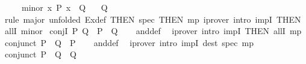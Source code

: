 \begin{isabellebody}
\ \ \ \ \ minor{\isacharcolon}{\kern0pt}\ {\isachardoublequoteopen}{\isasymAnd}x{\isachardot}{\kern0pt}\ P\ x\ {\isasymLongrightarrow}\ Q{\isachardoublequoteclose}\isanewline
\ \ \ {\isachardoublequoteopen}Q{\isachardoublequoteclose}\isanewline
%
\isadelimproof
\ \ %
\endisadelimproof
%
\isatagproof
{}\isamarkupfalse%
\ {\isacharparenleft}{\kern0pt}rule\ major\ {\isacharbrackleft}{\kern0pt}unfolded\ Ex{\isacharunderscore}{\kern0pt}def{\isacharcomma}{\kern0pt}\ THEN\ spec{\isacharcomma}{\kern0pt}\ THEN\ mp{\isacharbrackright}{\kern0pt}{\isacharparenright}{\kern0pt}\ {\isacharparenleft}{\kern0pt}iprover\ intro{\isacharcolon}{\kern0pt}\ impI\ {\isacharbrackleft}{\kern0pt}THEN\ allI{\isacharbrackright}{\kern0pt}\ minor{\isacharparenright}{\kern0pt}%
\endisatagproof
{\isafoldproof}%
%
\isadelimproof
%
\endisadelimproof
%
\isadelimdocument
%
\endisadelimdocument
%
\isatagdocument
%
\isamarkuptrue%
%
\endisatagdocument
{\isafolddocument}%
%
\isadelimdocument
%
\endisadelimdocument
{}\isamarkupfalse%
\ conjI{\isacharcolon}{\kern0pt}\ {\isachardoublequoteopen}{\isasymlbrakk}P{\isacharsemicolon}{\kern0pt}\ Q{\isasymrbrakk}\ {\isasymLongrightarrow}\ P\ {\isasymand}\ Q{\isachardoublequoteclose}\isanewline
%
\isadelimproof
\ \ %
\endisadelimproof
%
\isatagproof
{}\isamarkupfalse%
\ and{\isacharunderscore}{\kern0pt}def\ \isamarkupfalse%
\ {\isacharparenleft}{\kern0pt}iprover\ intro{\isacharcolon}{\kern0pt}\ impI\ {\isacharbrackleft}{\kern0pt}THEN\ allI{\isacharbrackright}{\kern0pt}\ mp{\isacharparenright}{\kern0pt}%
\endisatagproof
{\isafoldproof}%
%
\isadelimproof
\isanewline
%
\endisadelimproof
\isanewline
{}\isamarkupfalse%
\ conjunct{}{\isacharcolon}{\kern0pt}\ {\isachardoublequoteopen}{\isasymlbrakk}P\ {\isasymand}\ Q{\isasymrbrakk}\ {\isasymLongrightarrow}\ P{\isachardoublequoteclose}\isanewline
%
\isadelimproof
\ \ %
\endisadelimproof
%
\isatagproof
{}\isamarkupfalse%
\ and{\isacharunderscore}{\kern0pt}def\ \isamarkupfalse%
\ {\isacharparenleft}{\kern0pt}iprover\ intro{\isacharcolon}{\kern0pt}\ impI\ dest{\isacharcolon}{\kern0pt}\ spec\ mp{\isacharparenright}{\kern0pt}%
\endisatagproof
{\isafoldproof}%
%
\isadelimproof
\isanewline
%
\endisadelimproof
\isanewline
{}\isamarkupfalse%
\ conjunct{}{\isacharcolon}{\kern0pt}\ {\isachardoublequoteopen}{\isasymlbrakk}P\ {\isasymand}\ Q{\isasymrbrakk}\ {\isasymLongrightarrow}\ Q{\isachardoublequoteclose}\isanewline

\end{isabellebody}
